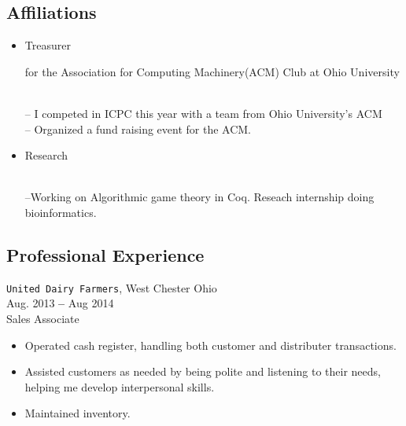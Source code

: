 \documentclass[11pt]{article} %
\begin{document}
\subsection*{Affiliations}
\begin{itemize}
\item{\begin{bf}Treasurer\end{bf} for the Association for Computing Machinery(ACM) Club at Ohio University}\\
-- I competed in ICPC this year with a team from Ohio University's ACM \\
-- Organized a fund raising event for the ACM.
\item{\begin{bf}Research\end{bf} }\\--Working on Algorithmic game theory in Coq. Reseach internship doing bioinformatics.  %
\end{itemize}


\subsection*{Professional Experience}
\texttt{United Dairy Farmers}, West Chester Ohio\\
Aug. 2013 \textbf{--} Aug 2014\\
Sales Associate
\begin{itemize}
\item{Operated cash register, handling both customer and distributer transactions.}
\item{ Assisted customers as needed by being polite and listening to their needs, helping me develop interpersonal skills.}
\item{ Maintained inventory.}
\end{itemize}

           
\end{document}
